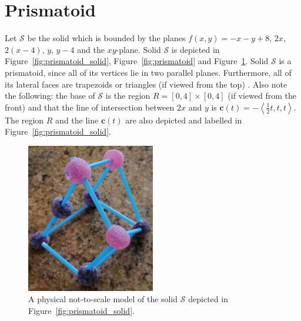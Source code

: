 \documentclass{article}
\theoremstyle{theorem}
\theoremstyle{definition}
\begin{document}
\section{Prismatoid}
Let $\mathcal{S}$ be the solid which is bounded by the planes $f(x,y)=-x-y+8$, $2x$, $2(x-4)$, $y$, $y-4$ and the $xy$-plane. Solid $\mathcal{S}$ is depicted 
in Figure~\ref{fig:prismatoid_solid}, Figure~\ref{fig:prismatoid} and Figure~\ref{fig:prismatoid_real}. Solid $\mathcal{S}$ is a prismatoid, since all of its 
vertices lie in two parallel planes. Furthermore, all of its lateral faces are trapezoids or triangles (if viewed from the top) \cite{bradley1979}. Also note the following: the base of $\mathcal{S}$ is the region 
 $R = [0,4]\times [0,4]$ (if viewed from the front) and that the line of intersection between $2x$ and $y$ is $\mathbf{c}(t) = -\left<\frac{1}{2}t,t,t\right>$. The region $R$ and the line $\mathbf{c}(t)$ are
also depicted and labelled in Figure~\ref{fig:prismatoid_solid}.\\

\begin{figure}[htb]
\centering
\includegraphics[width=0.5\textwidth]{prismatoid_real.jpg}
\caption{A physical not-to-scale model of the solid $\mathcal{S}$ depicted in Figure~\ref{fig:prismatoid_solid}.}
\label{fig:prismatoid_real}
\end{figure}
\end{document}
